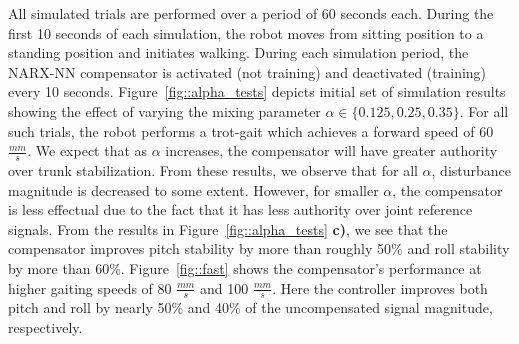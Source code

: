 			All simulated trials are performed over a period of 60 seconds each. During the first 10 seconds of each simulation, the robot moves from sitting position to a standing position and initiates walking. During each simulation period, the NARX-NN compensator is activated (not training)  and deactivated (training)  every 10 seconds. Figure~\ref{fig::alpha_tests} depicts initial set of simulation results showing the effect of varying  the mixing parameter $\alpha\in\{0.125, 0.25, 0.35\}$. For all such trials, the robot performs a trot-gait which achieves a forward speed of 60 $\frac{mm}{s}$. We expect that as $\alpha$ increases, the compensator will have greater authority over trunk stabilization. From these results, we observe that for all $\alpha$, disturbance magnitude is decreased to some extent. However, for smaller $\alpha$, the compensator is less effectual due to the fact that it has less authority over joint reference signals.  From the results in Figure~\ref{fig::alpha_tests} \textbf{c)}, we see that the compensator improves pitch stability by more than roughly 50\% and roll stability by more than 60\%. Figure~\ref{fig::fast} shows the compensator's performance at higher gaiting speeds of 80 $\frac{mm}{s}$ and 100 $\frac{mm}{s}$. Here the controller improves both pitch and roll by nearly 50\% and 40\% of the  uncompensated signal magnitude, respectively.